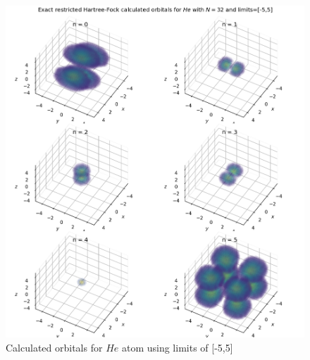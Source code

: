 \documentclass[10pt, oneside, letterpaper]{article}
\begin{document}
\begin{figure}[H]
  \begin{center}
    \includegraphics[scale=0.75]{he_N32_l5.png}
  \end{center}
  \caption{Calculated orbitals for $He$ atom using limits of [-5,5]}
  \label{he-plot-l5}
\end{figure}
\end{document}
